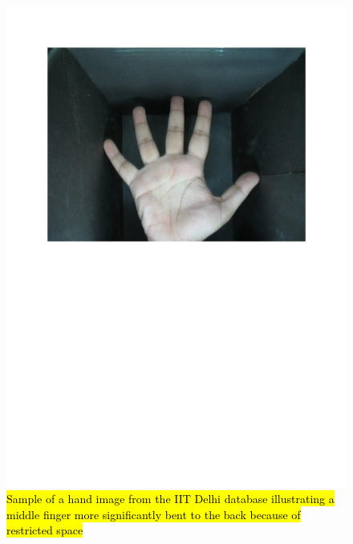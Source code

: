 \documentclass[review]{elsarticle}
\begin{document}
		\begin{figure}[!h]
			\centering
			\includegraphics[page=3,scale=.57,trim=1cm 14.7cm 1cm 1.7cm,clip]{IIT_problematic.pdf}
			\caption{\hl{Sample of a hand image from the IIT Delhi database illustrating a middle finger more significantly bent to the back because of restricted space}}
			\label{fig:IIT_problematic_hand2}
		\end{figure}
\end{document}
